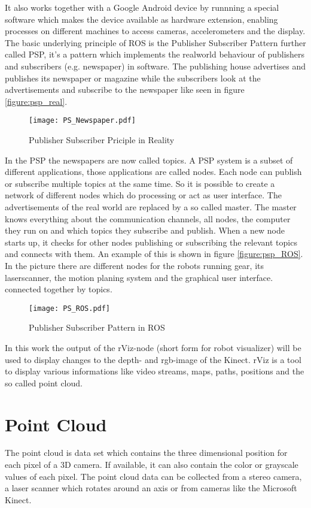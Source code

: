 It also works together with a Google Android device by runnning a special software which makes the device available
as hardware extension, enabling processes on different machines to access cameras, accelerometers and the display.
The basic underlying principle of ROS is the Publisher Subscriber Pattern further called PSP, it's a pattern which 
implements the realworld behaviour of publishers and subscribers (e.g. newspaper) in software. 
The publishing house advertises and publishes its newspaper or magazine while the subscribers look at the advertisements
and subscribe to the newspaper like seen in figure \vref{figure:psp_real}.

\begin{figure}[h]
	\centering
	\texttt{[image: PS\_Newspaper.pdf]}
	\caption{Publisher Subscriber Priciple in Reality}
	\label{figure:psp_real}
\end{figure} 


In the PSP the newspapers are now called topics. A PSP system is a subset of different applications, those applications are called nodes.  
Each node can publish or subscribe multiple topics at the same time. So it is possible to create a network of different nodes which
do processing or act as user interface. The advertisements of the real world are replaced by a so called master. 
The master knows everything about the communication channels, all nodes, the computer they run on and 
which topics they subscribe and publish. When a new node starts up, it checks for other nodes publishing or subscribing the relevant topics
and connects with them. An example of this is shown in figure \vref{figure:psp_ROS}.
In the picture there are different nodes for the robots running gear, its laserscanner, the motion planing system and the graphical user interface.
connected together by topics.

\begin{figure}[h]
	\centering
	\texttt{[image: PS\_ROS.pdf]}
	\caption{Publisher Subscriber Pattern in ROS}
	\label{figure:psp_ROS}
\end{figure} 

In this work the output of the rViz-node (short form for robot visualizer) will be used to display changes to the depth- and 
rgb-image of the Kinect. rViz is a tool to display various informations like video streams, maps, paths, positions and the
so called point cloud.

\section{Point Cloud}
The point cloud is data set which contains the three dimensional position for each pixel of a 3D camera. 
If available, it can also contain the color or grayscale values of each pixel. 
The point cloud data can be collected from a stereo camera, a laser scanner which rotates around an axis or 
from cameras like the Microsoft Kinect.


